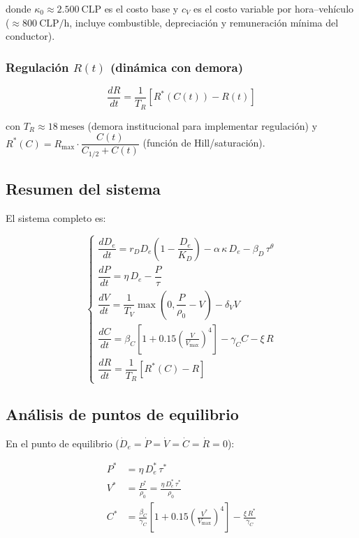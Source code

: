 \documentclass[12pt,a4paper]{article}
\begin{document}
donde $\kappa_0 \approx 2.500\ \text{CLP}$ es el costo base y $c_V$ es el costo
variable por hora--vehículo ($\approx 800\ \text{CLP/h}$, incluye combustible,
depreciación y remuneración mínima del conductor).

\subsubsection{Regulación $R(t)$ (dinámica con demora)}

\begin{equation}
\frac{dR}{dt} = \frac{1}{T_R}\left[R^*(C(t)) - R(t)\right]
\label{eq:regulacion}
\end{equation}

con $T_R \approx 18\ \text{meses}$ (demora institucional para implementar regulación)
y $R^*(C) = R_{\max}\cdot\dfrac{C(t)}{C_{1/2} + C(t)}$ (función de Hill/saturación).

\subsection{Resumen del sistema}

El sistema completo es:

\begin{equation}
\begin{cases}
\dfrac{dD_e}{dt} = r_D D_e\!\left(1 - \dfrac{D_e}{K_D}\right)
  - \alpha\,\kappa\, D_e - \beta_D\,\tau^\theta \\[12pt]
\dfrac{dP}{dt}   = \eta\,D_e - \dfrac{P}{\tau} \\[10pt]
\dfrac{dV}{dt}   = \dfrac{1}{T_V}\max\!\left(0,\dfrac{P}{\rho_0}-V\right) - \delta_V V \\[10pt]
\dfrac{dC}{dt}   = \beta_C\!\left[1+0.15\!\left(\tfrac{V}{V_{\max}}\right)^4\right]
  - \gamma_C C - \xi\,R \\[10pt]
\dfrac{dR}{dt}   = \dfrac{1}{T_R}\!\left[R^*(C) - R\right]
\end{cases}
\label{eq:sistema}
\end{equation}

\subsection{Análisis de puntos de equilibrio}

En el punto de equilibrio ($\dot{D}_e = \dot{P} = \dot{V} = \dot{C} = \dot{R} = 0$):

\begin{align}
P^* &= \eta\,D_e^*\,\tau^* \\
V^* &= \frac{P^*}{\rho_0} = \frac{\eta\,D_e^*\,\tau^*}{\rho_0} \\
C^* &= \frac{\beta_C}{\gamma_C}\!\left[1+0.15\!\left(\frac{V^*}{V_{\max}}\right)^4\right]
  - \frac{\xi\,R^*}{\gamma_C}
\end{align}
\end{document}
